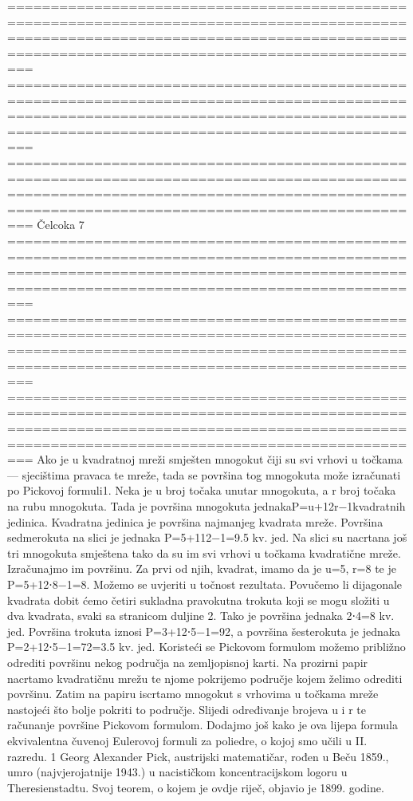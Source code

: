 ===========================================================================================================================================================================================
===========================================================================================================================================================================================
===========================================================================================================================================================================================
Čelcoka 7
===========================================================================================================================================================================================
===========================================================================================================================================================================================
===========================================================================================================================================================================================
Ako je u kvadratnoj mreži smješten mnogokut čiji su svi vrhovi u točkama --- sjecištima pravaca te mreže, tada se površina tog mnogokuta može izračunati po Pickovoj formuli1. Neka je u broj točaka unutar mnogokuta, a r broj točaka na rubu mnogokuta. Tada je površina mnogokuta jednakaP=u+12r−1kvadratnih jedinica. Kvadratna jedinica je površina najmanjeg kvadrata mreže.
Površina sedmerokuta na slici je jednaka P=5+112−1=9.5 kv. jed.
Na slici su nacrtana još tri mnogokuta smještena tako da su im svi vrhovi u točkama kvadratične mreže. Izračunajmo im površinu.
Za prvi od njih, kvadrat, imamo da je u=5, r=8 te je P=5+12⋅8−1=8.
Možemo se uvjeriti u točnost rezultata. Povučemo li dijagonale kvadrata dobit ćemo četiri sukladna pravokutna trokuta koji se mogu složiti u dva kvadrata, svaki sa stranicom duljine 2. Tako je površina jednaka 2⋅4=8 kv. jed.
Površina trokuta iznosi P=3+12⋅5−1=92, a površina šesterokuta je jednaka P=2+12⋅5−1=72=3.5 kv. jed.
Koristeći se Pickovom formulom možemo približno odrediti površinu nekog područja na zemljopisnoj karti. Na prozirni papir nacrtamo kvadratičnu mrežu te njome pokrijemo područje kojem želimo odrediti površinu. Zatim na papiru iscrtamo mnogokut s vrhovima u točkama mreže nastojeći što bolje pokriti to područje.
Slijedi određivanje brojeva u i r te računanje površine Pickovom formulom.
Dodajmo još kako je ova lijepa formula ekvivalentna čuvenoj Eulerovoj formuli za poliedre, o kojoj smo učili u II. razredu.
1 Georg Alexander Pick, austrijski matematičar, rođen u Beču 1859., umro (najvjerojatnije 1943.) u nacističkom koncentracijskom logoru u Theresienstadtu. Svoj teorem, o kojem je ovdje riječ, objavio je 1899. godine.
